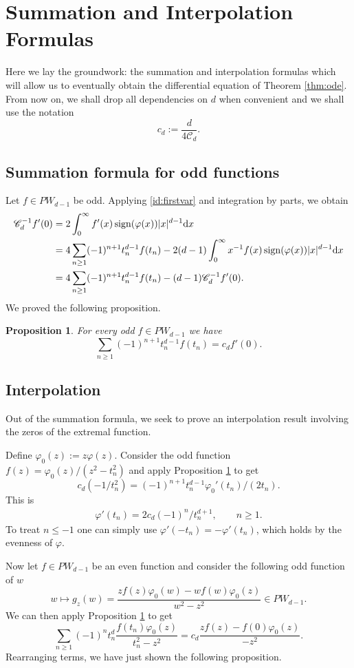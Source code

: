 \documentclass[a4paper,reqno,12pt]{amsart}
\newtheorem{proposition}[theorem]{Proposition}\newtheorem{corollary}[theorem]{Corollary}
\newcommand{\C}{\mathscr{C}}
\newcommand{\p}{\varphi}
\renewcommand{\d}{{\rm d}}
\newcommand{\sign}{{\rm sign}}
\begin{document}
\section{Summation and Interpolation Formulas}

Here we lay the groundwork: the summation and interpolation formulas which will allow us to eventually obtain the differential equation of Theorem \ref{thm:ode}. From now on, we shall drop all dependencies on $d$ when convenient and we shall use the notation
$$
c_d:= \frac{d}{4\C_d}. 
$$ 

\subsection{Summation formula for odd functions}
Let $f\in PW_{d-1}$ be odd. Applying \eqref{id:firstvar} and integration by parts, we obtain
\begin{align*}
    \C_d^{-1}f'(0) & = 2\int_0^\infty f'(x)\, \sign(\p(x))|x|^{d-1} \d x \\
    & = 4 \sum_{n\geq 1}(-1)^{n+1} t_n^{d-1}f(t_n) -  2(d-1)\int_0^\infty x^{-1}f(x)\, \sign(\p(x))|x|^{d-1} \d x \\
    & = 4 \sum_{n\geq 1}(-1)^{n+1} t_n^{d-1}f(t_n) -(d-1)\C_d^{-1}f'(0).
\end{align*}
We proved the following proposition.

\begin{proposition}\label{prop:oddsumm}
For every odd $f\in PW_{d-1}$ we have
$$
\sum_{n\geq 1} (-1)^{n+1}t_n^{d-1} f(t_n) = c_d f'(0).
$$
\end{proposition}

\subsection{Interpolation} Out of the summation formula, we seek to prove an interpolation result involving the zeros of the extremal function. 

Define $\p_0(z):=z\p(z)$. Consider the odd function $f(z)=\p_0(z)/(z^2-t_n^2)$ and apply Proposition \ref{prop:oddsumm} to get
$$
c_d(-1/t_n^2) = (-1)^{n+1}t_n^{d-1}\p_0'(t_n)/(2t_n).
$$
This is
\begin{align}\label{id:derivphi}
\p'(t_n)=2c_d (-1)^n/t_n^{d+1}, \qquad n \geq 1.
\end{align}
To treat $n \leq -1$ one can simply use $\p'(-t_n) = -\p'(t_n)$, which holds by the evenness of $\p$. 

Now let $f\in PW_{d-1}$ be an even function and consider the following odd function of $w$
$$
w\mapsto g_z(w)=\frac{zf(z)\p_0(w)-wf(w)\p_0(z)}{w^2-z^2} \in PW_{d-1}.
$$
We can then apply Proposition \ref{prop:oddsumm} to get
$$
\sum_{n\geq 1} (-1)^{n}t_n^{d}\frac{f(t_n)\p_0(z)}{t_n^2-z^2} = c_d \frac{zf(z)-f(0)\p_0(z)}{-z^2}.
$$
Rearranging terms, we have just shown the following proposition.
\end{document}
